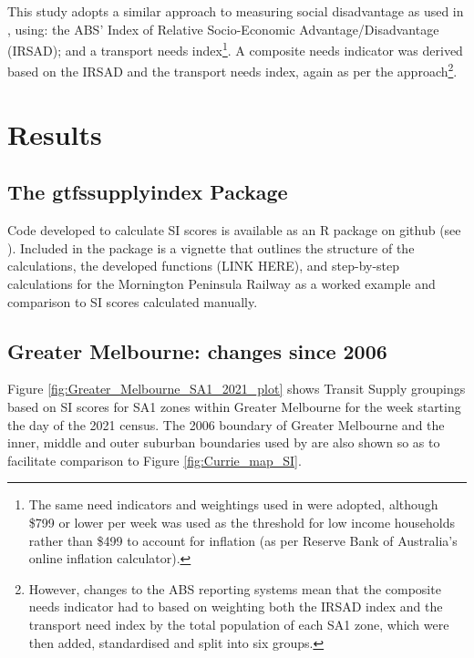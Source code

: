 \documentclass[preprint, 3p,
authoryear]{elsarticle} %
\begin{document}
This study adopts a similar approach to measuring social disadvantage as
used in \citet{currie2010identifying}, using: the ABS' Index of Relative
Socio-Economic Advantage/Disadvantage (IRSAD); and a transport needs
index\footnote{The same need indicators and weightings used in
  \citet{currie2010identifying} were adopted, although \$799 or lower
  per week was used as the threshold for low income households rather
  than \$499 to account for inflation (as per Reserve Bank of
  Australia's online inflation calculator).}. A composite needs
indicator was derived based on the IRSAD and the transport needs index,
again as per the \citet{currie2010identifying} approach\footnote{However,
  changes to the ABS reporting systems mean that the composite needs
  indicator had to based on weighting both the IRSAD index and the
  transport need index by the total population of each SA1 zone, which
  were then added, standardised and split into six groups.}.

\hypertarget{results}{%
\section{Results}\label{results}}

\hypertarget{the-gtfssupplyindex-package}{%
\subsection{The gtfssupplyindex
Package}\label{the-gtfssupplyindex-package}}

Code developed to calculate SI scores is available as an R package on
github (see \citet{gtfssupplyindex_github}). Included in the package is
a vignette that outlines the structure of the calculations, the
developed functions (LINK HERE), and step-by-step calculations for the
Mornington Peninsula Railway as a worked example and comparison to SI
scores calculated manually.

\hypertarget{greater-melbourne-changes-since-2006}{%
\subsection{Greater Melbourne: changes since
2006}\label{greater-melbourne-changes-since-2006}}

Figure \ref{fig:Greater_Melbourne_SA1_2021_plot} shows Transit Supply
groupings based on SI scores for SA1 zones within Greater Melbourne for
the week starting the day of the 2021 census. The 2006 boundary of
Greater Melbourne and the inner, middle and outer suburban boundaries
used by \citet{currie2010identifying} are also shown so as to facilitate
comparison to Figure \ref{fig:Currie_map_SI}.
\end{document}

